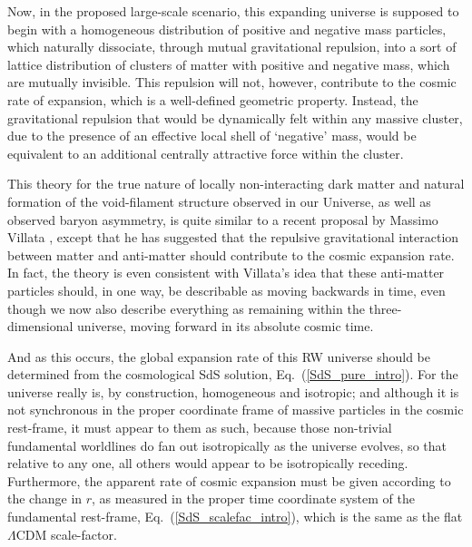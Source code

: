Now, in the proposed large-scale scenario, this expanding universe is supposed to begin with a homogeneous distribution of positive and negative mass particles, which naturally dissociate, through mutual gravitational repulsion, into a sort of lattice distribution of clusters of matter with positive and negative mass, which are mutually invisible. This repulsion will not, however, contribute to the cosmic rate of expansion, which is a well-defined geometric property. Instead, the gravitational repulsion that would be dynamically felt within any massive cluster, due to the presence of an effective local shell of `negative' mass, would be equivalent to an additional centrally attractive force within the cluster.

This theory for the true nature of locally non-interacting dark matter and natural formation of the void-filament structure observed in our Universe, as well as observed baryon asymmetry, is quite similar to a recent proposal by Massimo Villata \cite{Villata2011a,Villata2011b}, except that he has suggested that the repulsive gravitational interaction between matter and anti-matter should contribute to the cosmic expansion rate. In fact, the theory is even consistent with Villata's idea that these anti-matter particles should, in one way, be describable as moving backwards in time, even though we now also describe everything as remaining within the three-dimensional universe, moving forward in its absolute cosmic time.

And as this occurs, the global expansion rate of this RW universe should be determined from the cosmological SdS solution, Eq.~(\ref{SdS_pure_intro}). For the universe really is, by construction, homogeneous and isotropic; and although it is not synchronous in the proper coordinate frame of massive particles in the cosmic rest-frame, it must appear to them as such, because those non-trivial fundamental worldlines do fan out isotropically as the universe evolves, so that relative to any one, all others would appear to be isotropically receding. Furthermore, the apparent rate of cosmic expansion must be given according to the change in $r$, as measured in the proper time coordinate system of the fundamental rest-frame, Eq.~(\ref{SdS_scalefac_intro}), which is the same as the flat $\Lambda$CDM scale-factor.

